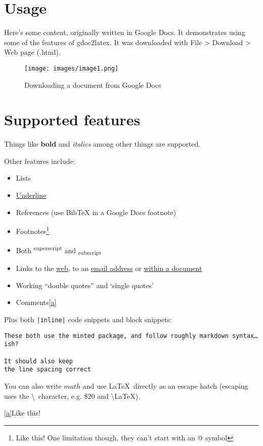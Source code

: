 \documentclass[12pt]{article}
\date{}
\author{}
\begin{document}
\maketitle



\section{Usage}\label{id:h.9brqho78gj4b}
Here’s some content, originally written in Google Docs. It demonstrates using some of the features of gdoc2latex. It was downloaded with File > Download > Web page (.html).

{\centering \begin{figure}[h!]
  \centering
  \texttt{[image: images/image1.png]}
  \caption{Downloading a document from Google Docs}
\end{figure} \par}
\section{Supported features}\label{id:h.3pfyws1px6lp}
Things like \textbf{bold} and \textit{italics} among other things are supported.

Other features include:
\begin{itemize}
  \item Lists
  \item \underline{Underline}
  \item References (use BibTeX in a Google Docs footnote)\cite{ref1}
  \item Footnotes\footnote{Like this! One limitation though, they can’t start with an @ symbol}
  \item Both \textsuperscript{superscript} and \textsubscript{subscript}
  \item Links to the \underline{\href{https://github.com/domdomegg/gdoc2latex}{web}}, to an \underline{\href{mailto:someone@example.com}{email address}} or \underline{\hyperref[id:h.9brqho78gj4b]{within a document}}
  \item Working “double quotes” and ‘single quotes’
  \item Comments\hyperref[id:cmnt1]{[a]}
\end{itemize}

Plus both \texttt{|inline|} code snippets and block snippets:

\begin{verbatim}
These both use the minted package, and follow roughly markdown syntax… ish?

It should also keep
the line spacing correct
\end{verbatim}

You can also write $math$ and use \LaTeX\ directly as an escape hatch (escaping uses the \textbackslash \ character, e.g. \$20 and \textbackslash LaTeX).




\hyperref[id:cmnt_ref1]{[a]}Like this!


\end{document}
